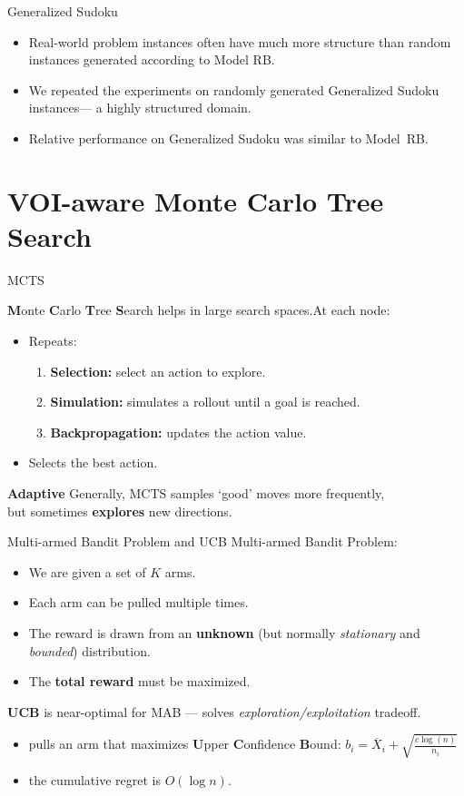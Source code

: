 \documentclass{beamer}
\begin{document}
\begin{frame}{Generalized Sudoku}
\begin{itemize}
\item Real-world problem instances often have much more structure
  than random instances generated according to Model RB.
\item We repeated the
  experiments on randomly generated Generalized Sudoku instances---
  a highly structured domain.
\item Relative performance on Generalized Sudoku was similar to
  Model~RB.
\end{itemize}
\end{frame}

\section{VOI-aware Monte Carlo Tree Search}

\begin{frame}{MCTS}

{\bf M}onte {\bf C}arlo {\bf T}ree {\bf S}earch helps in large search spaces.At each node:
\begin{itemize}
\item Repeats:
  \begin{enumerate}
    \item \textbf{Selection:} select an action to explore.
    \item \textbf{Simulation:} simulates a rollout until a goal is reached.
    \item \textbf{Backpropagation:} updates the action value.
  \end{enumerate}
\item Selects the best action.
\end{itemize}
\vspace{1em}
\textbf{Adaptive} Generally, MCTS samples `good' moves more frequently,\\
but sometimes {\bf explores} new directions.
\end{frame}

\begin{frame}{Multi-armed Bandit Problem and UCB}
Multi-armed Bandit Problem:
\begin{itemize}
\item We are given a set of $K$ arms.
\item Each arm can be pulled multiple times.
\item The reward is drawn from an {\bf unknown} (but normally {\it
    stationary} and {\it bounded}) distribution.
\item The {\bf total reward} must be maximized.
\end{itemize}

{\bf UCB} is near-optimal for MAB --- solves
{\it exploration/exploitation} tradeoff.
\begin{itemize}
\item pulls an arm that maximizes {\bf U}pper {\bf C}onfidence {\bf
    B}ound: $b_i=\overline X_i+\sqrt {\frac {c \log (n)} {n_i}}$
\item the cumulative regret is $O(\log n)$.
\end{itemize}
\end{frame}
\end{document}
